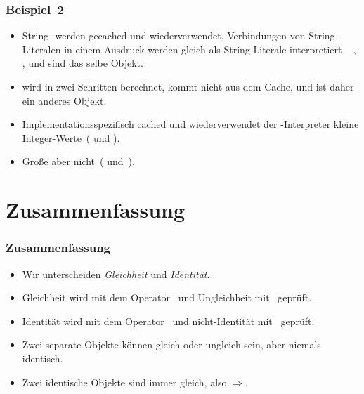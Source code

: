 \documentclass[aspectratio=169,mathserif,notheorems]{beamer}%
\begin{document}
\begin{frame}%
\frametitle{Beispiel~2}%
%
\parbox{0.334\paperwidth}{\small{%
\begin{itemize}%
\item String- werden gecached und wiederverwendet, Verbindungen von String-Literalen in einem Ausdruck werden gleich als String-Literale interpretiert -- , , und  sind das selbe Objekt.%
\item<2->  wird in zwei Schritten berechnet, kommt nicht aus dem Cache, und ist daher ein anderes Objekt.%
\item<3-> Implementationsspezifisch cached und wiederverwendet der \python-Interpreter kleine Integer-Werte~( und ).%
\item<4-> Große aber nicht~( und~).%
\end{itemize}%
}}%
%
%
%
\end{frame}%
%
\section{Zusammenfassung}%
%
\begin{frame}%
\frametitle{Zusammenfassung}%
\begin{itemize}%
\item Wir unterscheiden \emph{Gleichheit} und \emph{Identität}.%
\item<2-> Gleichheit wird mit dem Operator~\pythonil{==} und Ungleichheit mit~\pythonil{!=} geprüft.%
\item<3-> Identität wird mit dem Operator~ und nicht-Identität mit~ geprüft.%
\item<4-> Zwei separate Objekte können gleich oder ungleich sein, aber niemals identisch.%
\item<5-> Zwei identische Objekte sind immer gleich, also $\Rightarrow$.%
\end{itemize}%
\end{frame}%
%
\endPresentation%
\end{document}
